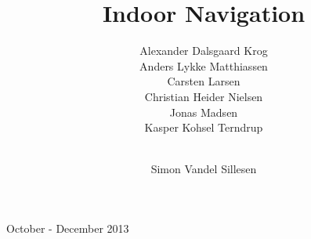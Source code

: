 \author{Alexander Dalsgaard Krog \andnext\\
    Anders Lykke Matthiassen \andnext\\
    Carsten Larsen \andnext\\
    Christian Heider Nielsen \andnext\\
    Jonas Madsen \andnext\\
    Kasper Kohsel Terndrup \and\\
    Simon Vandel Sillesen}

\title{Indoor Navigation}

\begin{titlingpage}

\vspace*{2cm}
     \vfill
     \centerline{October - December 2013}
     \clearpage


\end{titlingpage}
